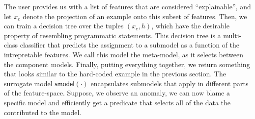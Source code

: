 The user provides us with a list of features that are considered ``explainable'', and let $x_e$ denote the projection of an example onto this subset of features.
Then, we can train a decision tree over the tuples $(x_e, h)$, which have the desirable property of resembling programmatic statements.
This decision tree is a multi-class classifier that predicts the assignment to a submodel as a function of the intrepretable features.
We call this model the meta-model, as it selects between the component models.
Finally, putting everything together, we return something that looks similar to the hard-coded example in the previous section.
The surrogate model $\textsf{smodel}(\cdot)$ encapsulates submodels that apply in different parts of the feature-space.
Suppose, we observe an anomaly, we can now blame a specific model and efficiently get a predicate that selects all of the data the contributed to the model.